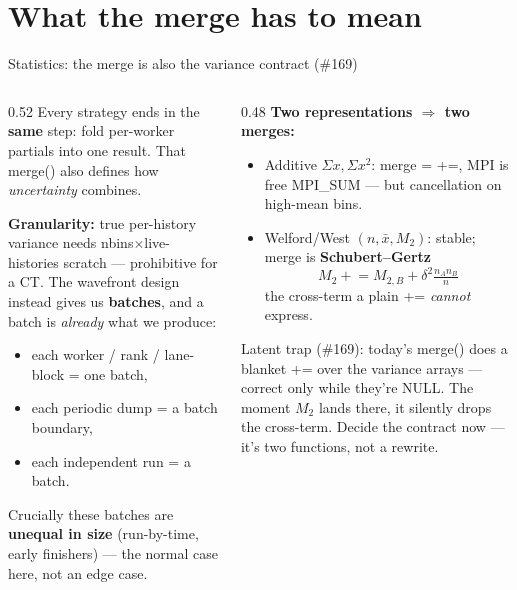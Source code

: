 \documentclass[aspectratio=169,10pt]{beamer}
\newcommand{\code}[1]{{\ttfamily\footnotesize #1}}
\begin{document}
\section{What the merge has to mean}
\begin{frame}{Statistics: the merge is also the variance contract (\#169)}
  \begin{columns}[T]
    \begin{column}{0.52\textwidth}
      \small
      Every strategy ends in the \textbf{same} step: fold per-worker partials
      into one result. That \code{merge()} also defines how \emph{uncertainty}
      combines.
      \medskip

      \textbf{Granularity:} true per-history variance needs
      \code{nbins$\times$live-histories} scratch — prohibitive for a CT. The
      wavefront design instead gives us \textbf{batches}, and a batch is
      \emph{already} what we produce:
      \begin{itemize}\scriptsize\itemsep1pt
        \item each worker / rank / lane-block = one batch,
        \item each periodic dump = a batch boundary,
        \item each independent run = a batch.
      \end{itemize}
      Crucially these batches are \textbf{unequal in size} (run-by-time, early
      finishers) — the normal case here, not an edge case.
    \end{column}
    \begin{column}{0.48\textwidth}
      \small
      \textbf{Two representations $\Rightarrow$ two merges:}
      \begin{itemize}\scriptsize\itemsep2pt
        \item \textcolor{oshAmber}{Additive} $\Sigma x,\Sigma x^2$:
              merge \code{=} \code{+=}, MPI is free \code{MPI\_SUM} — but
              cancellation on high-mean bins.
        \item \textcolor{oshGreen}{Welford/West $(n,\bar{x},M_2)$}:
              stable; merge is \textbf{Schubert--Gertz}
              \[ M_2 \mathrel{+}= M_{2,B} + \delta^2\tfrac{n_A n_B}{n} \]
              the cross-term a plain \code{+=} \emph{cannot} express.
      \end{itemize}
      \footnotesize\color{oshRed}
      Latent trap (\#169): today's \code{merge()} does a blanket \code{+=} over
      the variance arrays — correct only while they're NULL. The moment $M_2$
      lands there, it silently drops the cross-term. Decide the contract now —
      it's two functions, not a rewrite.
    \end{column}
  \end{columns}
\end{frame}
\end{document}
